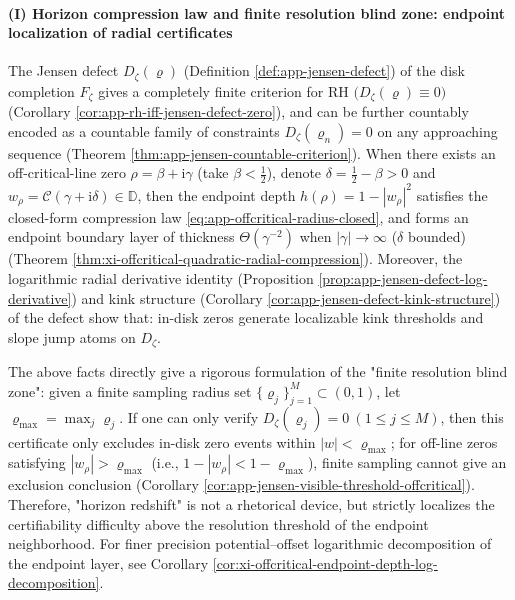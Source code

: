 \paragraph{(I) Horizon compression law and finite resolution blind zone: endpoint localization of radial certificates}
The Jensen defect \(D_{\zeta}(\varrho)\) (Definition \ref{def:app-jensen-defect}) of the disk completion \(F_{\zeta}\) gives a completely finite criterion for RH
\(\bigl(D_{\zeta}(\varrho)\equiv 0\bigr)\) (Corollary \ref{cor:app-rh-iff-jensen-defect-zero}), and can be further countably encoded as a countable family of constraints \(D_{\zeta}(\varrho_n)=0\) on any approaching sequence (Theorem \ref{thm:app-jensen-countable-criterion}).
When there exists an off-critical-line zero \(\rho=\beta+\mathrm{i}\gamma\) (take \(\beta<\tfrac12\)), denote \(\delta=\tfrac12-\beta>0\) and \(w_{\rho}=\mathcal{C}(\gamma+\mathrm{i}\delta)\in\mathbb{D}\), then the endpoint depth
\(
h(\rho)=1-|w_{\rho}|^{2}
\)
satisfies the closed-form compression law \eqref{eq:app-offcritical-radius-closed}, and forms an endpoint boundary layer of thickness \(\Theta(\gamma^{-2})\) when \(|\gamma|\to\infty\) (\(\delta\) bounded) (Theorem \ref{thm:xi-offcritical-quadratic-radial-compression}).
Moreover, the logarithmic radial derivative identity (Proposition \ref{prop:app-jensen-defect-log-derivative}) and kink structure (Corollary \ref{cor:app-jensen-defect-kink-structure}) of the defect show that: in-disk zeros generate localizable kink thresholds and slope jump atoms on \(D_{\zeta}\).
\par
The above facts directly give a rigorous formulation of the "finite resolution blind zone": given a finite sampling radius set \(\{\varrho_j\}_{j=1}^{M}\subset(0,1)\), let \(\varrho_{\max}=\max_j\varrho_j\). If one can only verify
\(
D_{\zeta}(\varrho_j)=0\ (1\le j\le M)
\),
then this certificate only excludes in-disk zero events within \(|w|<\varrho_{\max}\); for off-line zeros satisfying \(|w_{\rho}|>\varrho_{\max}\) (i.e., \(1-|w_{\rho}|<1-\varrho_{\max}\)), finite sampling cannot give an exclusion conclusion (Corollary \ref{cor:app-jensen-visible-threshold-offcritical}).
Therefore, "horizon redshift" is not a rhetorical device, but strictly localizes the certifiability difficulty above the resolution threshold of the endpoint neighborhood.
For finer precision potential--offset logarithmic decomposition of the endpoint layer, see Corollary \ref{cor:xi-offcritical-endpoint-depth-log-decomposition}.


